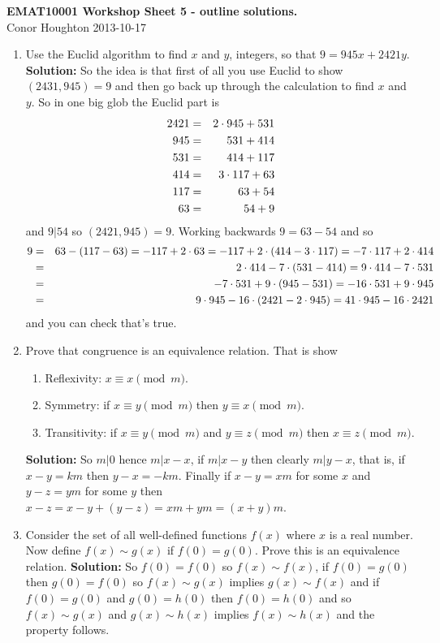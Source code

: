 \documentclass[12pt]{article}
\begin{document}
\begin{center}
{\bf EMAT10001 Workshop Sheet 5 - outline solutions.}\\[1cm]{} Conor Houghton 2013-10-17
\end{center}


\begin{enumerate}

\item Use the Euclid algorithm to find $x$ and $y$, integers, so that
  $9=945x+2421y$. \textbf{Solution: } So the idea is that first of all
  you use Euclid to show $(2431,945)=9$ and then go back up through
  the calculation to find $x$ and $y$. So in one big glob the Euclid
  part is
\begin{eqnarray}
2421&=&2\cdot 945+531\cr
945&=&531+414\cr
531&=&414+117\cr
414&=&3\cdot 117+63\cr
117&=&63+54\cr
63&=&54+9
\end{eqnarray}
and $9|54$ so $(2421,945)=9$. Working backwards $9=63-54$ and so
\begin{eqnarray}
9&=&63-(117-63)=-117+2\cdot 63=-117+2\cdot(414-3\cdot 117)=-7\cdot 117+2\cdot 414\cr
&=&2\cdot 414-7\cdot (531-414)=9\cdot 414-7\cdot 531\cr
&=&-7\cdot 531 +9\cdot (945-531)=-16\cdot 531+9\cdot 945\cr
&=&9\cdot 945 -16\cdot(2421-2\cdot 945)=41\cdot 945-16\cdot 2421
\end{eqnarray}
and you can check that's true.

\item Prove that congruence is an equivalence relation. That is show
\begin{enumerate}
\item Reflexivity: $x\equiv x \pmod m$.
\item Symmetry: if $x\equiv y \pmod m$ then $y\equiv x \pmod m$.
\item Transitivity: if $x\equiv y \pmod m$ and
  $y\equiv z \pmod m$ then $x\equiv z \pmod m$.
\end{enumerate}
\textbf{Solution:} So $m|0$ hence $m|x-x$, if $m|x-y$ then clearly
$m|y-x$, that is, if $x-y=km$ then $y-x=-km$. Finally if $x-y=xm$ for
some $x$ and $y-z=ym$ for some $y$ then $x-z=x-y+(y-z)=xm+ym=(x+y)m$.

\item Consider the set of all well-defined functions $f(x)$ where $x$
  is a real number. Now define $f(x)\sim g(x)$ if $f(0)=g(0)$. Prove
  this is an equivalence relation. \textbf{Solution: } So $f(0)=f(0)$
  so $f(x)\sim f(x)$, if $f(0)=g(0)$ then $g(0)=f(0)$ so $f(x)\sim
  g(x)$ implies $g(x)\sim f(x)$ and if $f(0)=g(0)$ and $g(0)=h(0)$
  then $f(0)=h(0)$ and so $f(x)\sim g(x)$ and $g(x)\sim h(x)$ implies
  $f(x)\sim h(x)$ and the property follows.


\end{enumerate}
\end{document}
